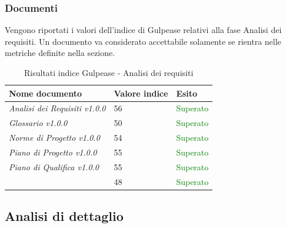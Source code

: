 	 	\subsubsection{Documenti}
	 	Vengono riportati i valori dell'indice di Gulpease relativi alla fase Analisi dei requisiti. Un documento va considerato accettabile solamente se rientra nelle metriche definite nella sezione.
		\begin{table}[!ht]
			\begin{center}
				\begin{tabularx}{0.9\textwidth}{|l|l|X|}
					\hline
					\textbf{Nome documento} & \textbf{Valore indice} & \textbf{Esito}\\
					\hline						
					\emph{Analisi dei Requisiti v1.0.0} & 56 & \textcolor{green}{Superato}\\
					\hline
					\emph{Glossario v1.0.0} & 50 & \textcolor{green}{Superato}\\
					\hline					
					\emph{Norme di Progetto v1.0.0} & 54 & \textcolor{green}{Superato}\\
					\hline					
					\emph{Piano di Progetto v1.0.0} & 55 & \textcolor{green}{Superato}\\
					\hline					
					\emph{Piano di Qualifica v1.0.0} & 55 & \textcolor{green}{Superato}\\
					\hline					
					\docNameVersionSdF & 48 & \textcolor{green}{Superato}\\
					\hline				
				\end{tabularx}
			\end{center}
			\caption{Risultati indice Gulpease - Analisi dei requisiti}
		\end{table}
		
	\subsection{Analisi di dettaglio}

